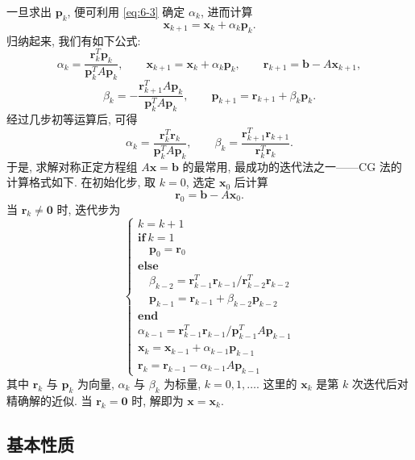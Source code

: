 一旦求出 $\mathbf{p}_k$, 便可利用 \eqref{eq:6-3} 确定 $\alpha_k$, 进而计算
\[
  \mathbf{x}_{k+1}=\mathbf{x}_k+\alpha_k\mathbf{p}_k.
\]
归纳起来, 我们有如下公式:
\[
  \alpha_k=\frac{\mathbf{r}_k^T\mathbf{p}_k}{\mathbf{p}_k^TA\mathbf{p}_k},
  \qquad
  \mathbf{x}_{k+1}=\mathbf{x}_k+\alpha_k\mathbf{p}_k,
  \qquad
  \mathbf{r}_{k+1}=\mathbf{b}-A\mathbf{x}_{k+1},
\]
\[
  \beta_k=-\frac{\mathbf{r}_{k+1}^TA\mathbf{p}_k}{\mathbf{p}_k^TA\mathbf{p}_k},
  \qquad
  \mathbf{p}_{k+1}=\mathbf{r}_{k+1}+\beta_k\mathbf{p}_k.
\]
经过几步初等运算后, 可得
\[
  \alpha_k=\frac{\mathbf{r}_k^T\mathbf{r}_k}{\mathbf{p}_k^TA\mathbf{p}_k},
  \qquad
  \beta_k=\frac{\mathbf{r}_{k+1}^T\mathbf{r}_{k+1}}{\mathbf{r}_k^T\mathbf{r}_k}.
\]
于是, 求解对称正定方程组 $A\mathbf{x}=\mathbf{b}$ 的最常用, 最成功的迭代法之一——CG 法的计算格式如下. 在初始化步, 取 $k=0$, 选定 $\mathbf{x}_0$ 后计算
\[
  \mathbf{r}_0=\mathbf{b}-A\mathbf{x}_0.
\]
当 $\mathbf{r}_k\neq\mathbf{0}$ 时, 迭代步为
\[
  \left\{
  \begin{array}{l}
    k=k+1\\
    \textbf{if}\ k=1\\
    \quad \mathbf{p}_0=\mathbf{r}_0\\
    \textbf{else}\\
    \quad \beta_{k-2}=\mathbf{r}_{k-1}^T\mathbf{r}_{k-1}
      /\mathbf{r}_{k-2}^T\mathbf{r}_{k-2}\\
    \quad \mathbf{p}_{k-1}=\mathbf{r}_{k-1}+\beta_{k-2}\mathbf{p}_{k-2}\\
    \textbf{end}\\
    \alpha_{k-1}=\mathbf{r}_{k-1}^T\mathbf{r}_{k-1}
      /\mathbf{p}_{k-1}^TA\mathbf{p}_{k-1}\\
    \mathbf{x}_k=\mathbf{x}_{k-1}+\alpha_{k-1}\mathbf{p}_{k-1}\\
    \mathbf{r}_k=\mathbf{r}_{k-1}-\alpha_{k-1}A\mathbf{p}_{k-1}
  \end{array}
  \right.
\]
其中 $\mathbf{r}_k$ 与 $\mathbf{p}_k$ 为向量, $\alpha_k$ 与 $\beta_k$ 为标量, $k=0,1,\ldots$. 这里的 $\mathbf{x}_k$ 是第 $k$ 次迭代后对精确解的近似. 当 $\mathbf{r}_k=\mathbf{0}$ 时, 解即为 $\mathbf{x}=\mathbf{x}_k$.

\subsection{基本性质}
\label{subsec:6-2-2}

